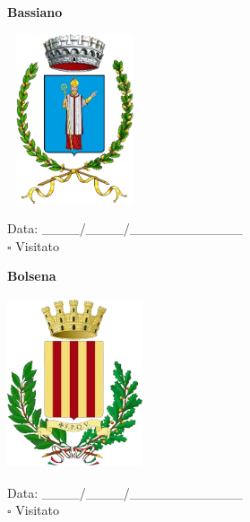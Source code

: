 \documentclass[a5paper,12pt]{article}
\begin{document}
\vspace{0.7cm}

\noindent
\begin{minipage}[t]{0.45\textwidth}
    \begin{center}
        \textbf{Bassiano}
    \end{center}
    \vspace{-0.5cm} %
    \begin{center}
        \includegraphics[height= 5cm, width=4cm]{Lazio/Stemma Bassiano.png}
    \end{center}
    \vspace{-0.4cm} %
    \begin{flushleft}
        Data: \_\_\_\_/\_\_\_\_/\_\_\_\_\_\_\_\_\_\_\_\_ \\
        $\square$ Visitato
    \end{flushleft}
\end{minipage}
\hfill
\noindent
\begin{minipage}[t]{0.45\textwidth}
    \begin{center}
        \textbf{Bolsena}
    \end{center}
    \vspace{-0.5cm} %
    \begin{center}
        \includegraphics[height= 5cm, width=4cm]{Lazio/Stemma Bolsena.png}
    \end{center}
    \vspace{-0.4cm} %
    \begin{flushleft}
        Data: \_\_\_\_/\_\_\_\_/\_\_\_\_\_\_\_\_\_\_\_\_ \\
        $\square$ Visitato
    \end{flushleft}
\end{minipage}
\end{document}
